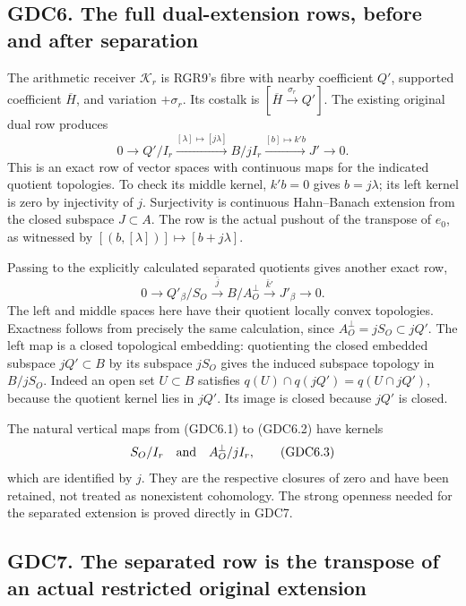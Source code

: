 \subsection{GDC6. The full dual-extension rows, before and after
separation}\label{gdc6.-the-full-dual-extension-rows-before-and-after-separation}

The arithmetic receiver \(\mathscr K_r\) is RGR9's fibre with nearby
coefficient \(Q'\), supported coefficient \(\overline H\), and variation
\(+\sigma_r\). Its costalk is \([\overline H\xrightarrow{\sigma_r}Q']\).
The existing original dual row produces \[
0\to Q'/I_r\xrightarrow{[\lambda]\mapsto[j\lambda]}
B/jI_r\xrightarrow{[b]\mapsto k'b}J'\to0.
\tag{GDC6.1}
\] This is an exact row of vector spaces with continuous maps for the
indicated quotient topologies. To check its middle kernel, \(k'b=0\)
gives \(b=j\lambda\); its left kernel is zero by injectivity of \(j\).
Surjectivity is continuous Hahn--Banach extension from the closed
subspace \(J\subset A\). The row is the actual pushout of the transpose
of \(e_0\), as witnessed by \([(b,[\lambda])]\mapsto[b+j\lambda]\).

Passing to the explicitly calculated separated quotients gives another
exact row, \[
\boxed{0\to Q'_\beta/S_O\xrightarrow{\bar j}
B/A_O^\perp\xrightarrow{\bar k'}J'_\beta\to0.}
\tag{GDC6.2}
\] The left and middle spaces here have their quotient locally convex
topologies. Exactness follows from precisely the same calculation, since
\(A_O^\perp=jS_O\subset jQ'\). The left map is a closed topological
embedding: quotienting the closed embedded subspace \(jQ'\subset B\) by
its subspace \(jS_O\) gives the induced subspace topology in \(B/jS_O\).
Indeed an open set \(U\subset B\) satisfies
\(q(U)\cap q(jQ')=q(U\cap jQ')\), because the quotient kernel lies in
\(jQ'\). Its image is closed because \(jQ'\) is closed.

The natural vertical maps from (GDC6.1) to (GDC6.2) have kernels \[
S_O/I_r\quad\hbox{and}\quad A_O^\perp/jI_r,
\tag{GDC6.3}
\] which are identified by \(j\). They are the respective closures of
zero and have been retained, not treated as nonexistent cohomology. The
strong openness needed for the separated extension is proved directly in
GDC7.

\subsection{GDC7. The separated row is the transpose of an actual
restricted original
extension}\label{gdc7.-the-separated-row-is-the-transpose-of-an-actual-restricted-original-extension}

